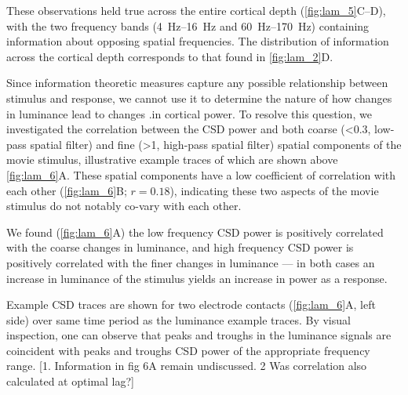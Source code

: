 These observations held true across the entire cortical depth (\autoref{fig:lam_5}C--D), with the two frequency bands (\SIrange{4}{16}{Hz} and \SIrange{60}{170}{Hz}) containing information about opposing spatial frequencies.
The distribution of information across the cortical depth corresponds to that found in \autoref{fig:lam_2}D.

Since information theoretic measures capture any possible relationship between stimulus and response, we cannot use it to determine the nature of how changes in luminance lead to changes .in cortical power.
To resolve this question, we investigated the correlation between the \ac{CSD} power and both coarse (\SI{<0.3}{\cpd}, low-pass spatial filter) and fine (\SI{>1}{\cpd}, high-pass spatial filter) spatial components of the movie stimulus, illustrative example traces of which are shown above \autoref{fig:lam_6}A.
These spatial components have a low coefficient of correlation with each other (\autoref{fig:lam_6}B; $r=0.18$), indicating these two aspects of the movie stimulus do not notably co-vary with each other.

We found (\autoref{fig:lam_6}A) the low frequency \ac{CSD} power is positively correlated with the coarse changes in luminance, and high frequency \ac{CSD} power is positively correlated with the finer changes in luminance --- in both cases an increase in luminance of the stimulus yields an increase in power as a response.

Example \ac{CSD} traces are shown for two electrode contacts (\autoref{fig:lam_6}A, left side) over same time period as the luminance example traces.
By visual inspection, one can observe that peaks and troughs in the luminance signals are coincident with peaks and troughs \ac{CSD} power of the appropriate frequency range.
[1. Information in fig 6A remain undiscussed. 2 Was correlation also calculated at optimal lag?]

